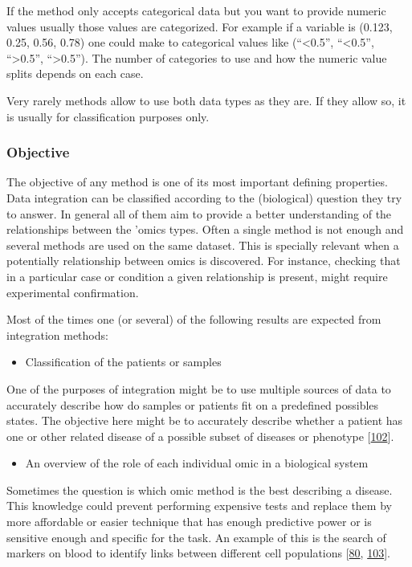\documentclass[
  a4paper,
]{book}
\providecommand{\tightlist}{%
  \setlength{\itemsep}{0pt}\setlength{\parskip}{0pt}}
\begin{document}
If the method only accepts categorical data but you want to provide numeric values usually those values are categorized.
For example if a variable is (0.123, 0.25, 0.56, 0.78) one could make to categorical values like (``\textless0.5'', ``\textless0.5'', ``\textgreater0.5'', ``\textgreater0.5'').
The number of categories to use and how the numeric value splits depends on each case.

Very rarely methods allow to use both data types as they are.
If they allow so, it is usually for classification purposes only.

\hypertarget{objective}{%
\subsubsection{Objective}\label{objective}}

The objective of any method is one of its most important defining properties.
Data integration can be classified according to the (biological) question they try to answer.
In general all of them aim to provide a better understanding of the relationships between the 'omics types.
Often a single method is not enough and several methods are used on the same dataset.
This is specially relevant when a potentially relationship between omics is discovered.
For instance, checking that in a particular case or condition a given relationship is present, might require experimental confirmation.

Most of the times one (or several) of the following results are expected from integration methods:

\begin{itemize}
\tightlist
\item
  Classification of the patients or samples
\end{itemize}

One of the purposes of integration might be to use multiple sources of data to accurately describe how do samples or patients fit on a predefined possibles states.
The objective here might be to accurately describe whether a patient has one or other related disease of a possible subset of diseases or phenotype {[}\protect\hyperlink{ref-rohart2016}{102}{]}.

\begin{itemize}
\tightlist
\item
  An overview of the role of each individual omic in a biological system
\end{itemize}

Sometimes the question is which omic method is the best describing a disease.
This knowledge could prevent performing expensive tests and replace them by more affordable or easier technique that has enough predictive power or is sensitive enough and specific for the task.
An example of this is the search of markers on blood to identify links between different cell populations {[}\protect\hyperlink{ref-tang2017}{80}, \protect\hyperlink{ref-ibrahim2017}{103}{]}.
\end{document}
